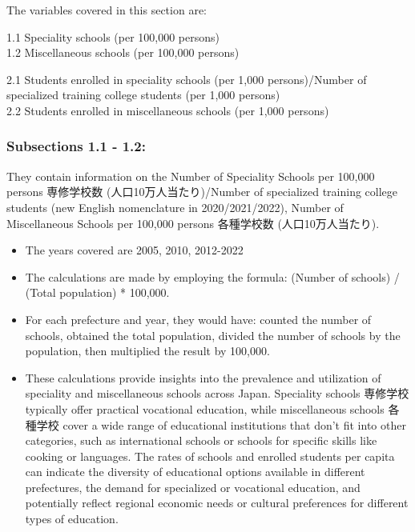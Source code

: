 \documentclass[
  12pt,
  letterpaper,
  DIV=11,
  numbers=noendperiod]{scrartcl}
\begin{document}
The variables covered in this section are:

1.1 Speciality schools (per 100,000 persons)\\
1.2 Miscellaneous schools (per 100,000 persons)

2.1 Students enrolled in speciality schools (per 1,000 persons)/Number
of specialized training college students (per 1,000 persons)\\
2.2 Students enrolled in miscellaneous schools (per 1,000 persons)

\hypertarget{subsections-1.1---1.2-2}{%
\subsubsection{Subsections 1.1 - 1.2:}\label{subsections-1.1---1.2-2}}

They contain information on the Number of Speciality Schools per 100,000
persons 専修学校数 (人口10万人当たり)/Number of specialized training
college students (new English nomenclature in 2020/2021/2022), Number of
Miscellaneous Schools per 100,000 persons 各種学校数 (人口10万人当たり).

\begin{itemize}
\item
  The years covered are 2005, 2010, 2012-2022
\item
  The calculations are made by employing the formula: (Number of
  schools) / (Total population) * 100,000.
\item
  For each prefecture and year, they would have: counted the number of
  schools, obtained the total population, divided the number of schools
  by the population, then multiplied the result by 100,000.
\item
  These calculations provide insights into the prevalence and
  utilization of speciality and miscellaneous schools across Japan.
  Speciality schools 専修学校 typically offer practical vocational
  education, while miscellaneous schools 各種学校 cover a wide range of
  educational institutions that don't fit into other categories, such as
  international schools or schools for specific skills like cooking or
  languages. The rates of schools and enrolled students per capita can
  indicate the diversity of educational options available in different
  prefectures, the demand for specialized or vocational education, and
  potentially reflect regional economic needs or cultural preferences
  for different types of education.
\end{itemize}
\end{document}
